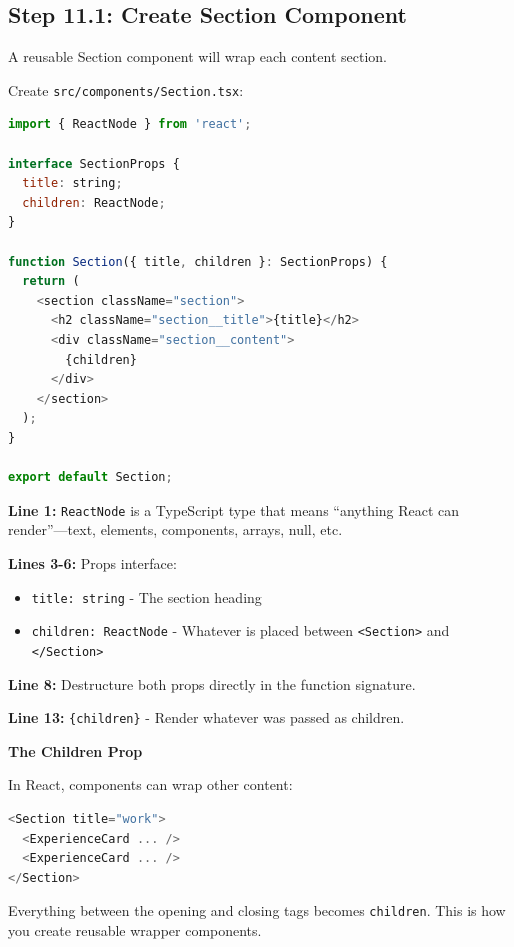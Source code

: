 \documentclass[12pt,a4paper]{article}
\begin{document}
\subsection{Step 11.1: Create Section Component}

A reusable Section component will wrap each content section.

Create \texttt{src/components/Section.tsx}:

\begin{lstlisting}[language=JavaScript,caption={src/components/Section.tsx}]
import { ReactNode } from 'react';

interface SectionProps {
  title: string;
  children: ReactNode;
}

function Section({ title, children }: SectionProps) {
  return (
    <section className="section">
      <h2 className="section__title">{title}</h2>
      <div className="section__content">
        {children}
      </div>
    </section>
  );
}

export default Section;
\end{lstlisting}

\begin{explanation}
\textbf{Line 1:} \texttt{ReactNode} is a TypeScript type that means ``anything React can render''---text, elements, components, arrays, null, etc.

\textbf{Lines 3-6:} Props interface:
\begin{itemize}
    \item \texttt{title: string} - The section heading
    \item \texttt{children: ReactNode} - Whatever is placed between \texttt{<Section>} and \texttt{</Section>}
\end{itemize}

\textbf{Line 8:} Destructure both props directly in the function signature.

\textbf{Line 13:} \texttt{\{children\}} - Render whatever was passed as children.
\end{explanation}

\begin{concept}
\textbf{The Children Prop}

In React, components can wrap other content:
\begin{lstlisting}[language=JavaScript]
<Section title="work">
  <ExperienceCard ... />
  <ExperienceCard ... />
</Section>
\end{lstlisting}

Everything between the opening and closing tags becomes \texttt{children}. This is how you create reusable wrapper components.
\end{concept}
\end{document}

